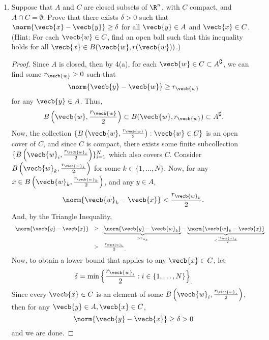 \documentclass[a5paper]{article}
\theoremstyle{definition}%
\numberwithin{exercise}{section}
\theoremstyle{remark}%
\begin{document}
\begin{enumerate}
\begin{enumerate}[label=(\alph*)]
	\item Suppose that $A$ and $C$ are closed subsets of $\R^n$, with $C$ compact, and $A\cap C=\emptyset$. Prove that there exists $\delta>0$ such that $\norm{\vecb{x}-\vecb{y}}\geq\delta$ for all $\vecb{y}\in A$ and $\vecb{x}\in C$. (Hint: For each $\vecb{w} \in C$, find an open ball such that this inequality holds for all $\vecb{x} \in B(\vecb{w},r(\vecb{w}))$.)
	\begin{proof}
	Since $A$ is closed, then by 4(a), for each $\vecb{w}\in C\subset A^\complement$, we can find some ${r}_\vecb{w}>0$ such that 
	$$\norm{\vecb{y}-\vecb{w}}\geq{{r}_\vecb{w}}$$
	for any $\vecb{y}\in A$. Thus, 
	$$B\left(\vecb{w}, \frac{{r}_\vecb{w}}{2}\right) \subset	B(\vecb{w}, {r}_\vecb{w}) \subset A^\complement.$$
	Now, the collection $\{B\left(\vecb{w}, \frac{{r}_\vecb{w}}{2}\right):\vecb{w}\in C\}$ is an open cover of $C$, and since $C$ is compact, there exists some finite subcollection $\{B\left(\vecb{w}_i, \frac{{r}_{\vecb{w}_i}}{2}\right)\}_{i=1}^N$ which also covers $C$. Consider $B\left(\vecb{w}_k, \frac{{r}_{\vecb{w}_k}}{2}\right)$ for some $k\in \{1, \ldots, N\}$. Now, for any $x\in B\left(\vecb{w}_k, \frac{{r}_{\vecb{w}_k}}{2}\right)$, and any $y\in A$,
	$$\norm{\vecb{w}_k-\vecb{x}}<\frac{{r}_{\vecb{w}_k}}{2}.$$
	And, by the Triangle Inequality, 
	\[\begin{array}{rcl}
	\norm{\vecb{y}-\vecb{x}} &\geq& \underbrace{\norm{\vecb{y}-\vecb{w}_k}}_{>r_{w_k}}-\underbrace{\norm{\vecb{w}_k-\vecb{x}}}_{<\frac{{r}_{\vecb{w}_k}}{2}}\\
	&>&\frac{{r}_{\vecb{w}_k}}{2}_.
	\end{array}\]
	Now, to obtain a lower bound that applies to any $\vecb{x}\in C$, let 
	$$\delta=\min\left\lbrace\frac{{r}_{\vecb{w}_i}}{2}:i\in \{1, \ldots, N\}\right\rbrace_.$$
	Since every $\vecb{x}\in C$ is an element of some $B\left(\vecb{w}_i, \frac{{r}_{\vecb{w}_i}}{2}\right)$, then for any $\vecb{y}\in A, \vecb{x}\in C$, 
	$$\norm{\vecb{y}-\vecb{x}}\geq \delta > 0$$
	and we are done. 	
	\end{proof}
	

\end{enumerate}
\end{enumerate}
\end{document}
